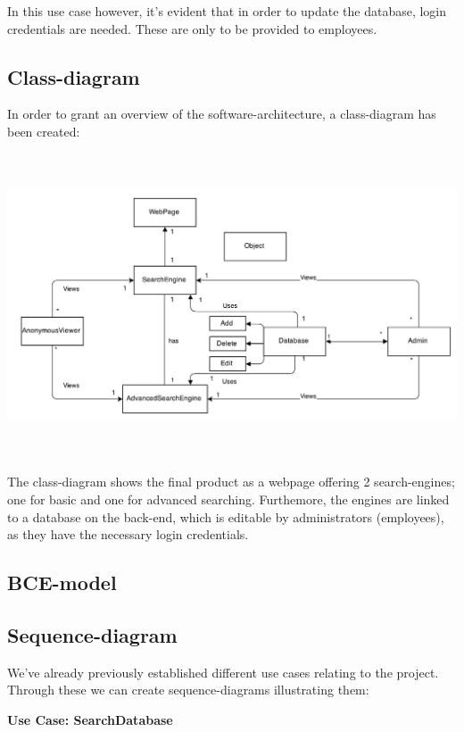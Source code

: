 \documentclass[12pt,a4paper]{article}
\begin{document}
In this use case however, it's evident that in order to update the database, login credentials are needed. These are only to be provided to employees.
\newpage

\subsection{Class-diagram}

In order to grant an overview of the software-architecture, a class-diagram has been created:

\includegraphics[height=90mm]{ClassDiagram.png}

The class-diagram shows the final product as a webpage offering 2 search-engines; one for basic and one for advanced searching.
Furthemore, the engines are linked to a database on the back-end, which is editable by administrators (employees), as they have the necessary login credentials. 

\subsection{BCE-model}

\newpage
\subsection{Sequence-diagram}
We've already previously established different use cases relating to the project. Through these we can create sequence-diagrams illustrating them:

{\bf Use Case: SearchDatabase}\\
\end{document}
